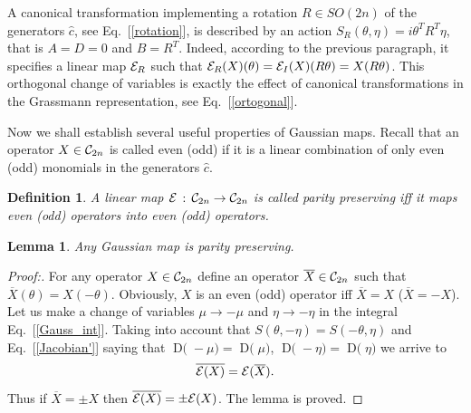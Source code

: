 \documentclass[twocolumn,showpacs,preprintnumbers,superscriptaddress]{revtex4}
\newtheorem{lemma}{Lemma}
\newtheorem{dfn}{Definition}
\newcommand{\calE}{{\cal E }}
\newcommand{\Clif}{{\cal C}}
\newcommand{\D}[1]{\mathop{\mathrm{D}#1}}
\newcommand{\be}{\begin{equation}}
\newcommand{\ee}{\end{equation}}
\newcommand{\cop}{{\hat{c}}}
\begin{document}
A canonical transformation implementing a rotation $R\in SO(2n)$
of the generators $\cop$, see Eq.~[\ref{rotation}],
is described by an action $S_R(\theta,\eta)=i\theta^T R^T \eta$, that is
$A=D=0$ and $B=R^T$. Indeed, according to the previous paragraph,
it specifies a linear map $\calE_R$ such that
$\calE_R(X)(\theta)= \calE_I(X)(R\theta)=X(R\theta)$.
This orthogonal change of variables is exactly the effect of
canonical transformations in the Grassmann representation, see Eq.~[\ref{ortogonal}]. 

Now we shall establish several useful properties of Gaussian maps.
Recall that an operator $X\in \Clif_{2n}$ is called even (odd) if 
it is a linear combination of only even (odd) monomials in the generators $\cop$.
\begin{dfn}
A linear map $\calE\, : \, \Clif_{2n}\to \Clif_{2n}$  is
called parity preserving iff it maps even (odd) operators into
even (odd) operators.
\end{dfn}
\begin{lemma}\label{lemma:parity}
Any Gaussian map is  parity preserving.
\end{lemma}
\begin{proof}[Proof:]
For any operator $X\in \Clif_{2n}$ define an operator $\overline{X}\in \Clif_{2n}$
such that $\overline{X}(\theta)=X(-\theta)$. Obviously, $X$ is an even (odd) operator
iff $\overline{X}=X$ ($\overline{X}=-X$). Let us make a change of variables
$\mu\to -\mu$ and $\eta\to -\eta$ in the integral Eq.~[\ref{Gauss_int}].
Taking into account that $S(\theta,-\eta)=S(-\theta,\eta)$ and 
Eq.~[\ref{Jacobian'}] saying that $\D(-\mu)=\D(\mu)$, $\D(-\eta)=\D(\eta)$
we arrive to
\be\label{pp}
\overline{\calE(X)}=\calE(\overline{X}).
\ee
Thus if $\overline{X}=\pm X$ then $\overline{\calE(X)}=\pm \calE(X)$. The lemma is proved.
\end{proof}
\end{document}
